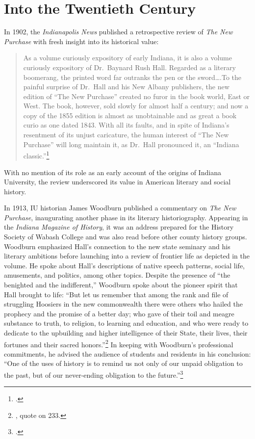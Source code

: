 \documentclass[
  american,
  letterpaper,
]{scrreprt}
\begin{document}
\section{Into the Twentieth Century}\label{into-the-twentieth-century}

In 1902, the \emph{Indianapolis News} published a retrospective review
of \emph{The New Purchase} with fresh insight into its historical value:

\begin{quote}
As a volume curiously expository of early Indiana, it is also a volume
curiously expository of Dr.~Baynard Rush Hall. Regarded as a literary
boomerang, the printed word far outranks the pen or the sword\ldots.To
the painful surprise of Dr.~Hall and his New Albany publishers, the new
edition of ``The New Purchase'' created no furor in the book world, East
or West. The book, however, sold slowly for almost half a century; and
now a copy of the 1855 edition is almost as unobtainable and as great a
book curio as one dated 1843. With all its faults, and in spite of
Indiana's resentment of its unjust caricature, the human interest of
``The New Purchase'' will long maintain it, as Dr.~Hall pronounced it,
an ``Indiana classic.''\footnote{.}
\end{quote}

With no mention of its role as an early account of the origins of
Indiana University, the review underscored its value in American
literary and social history.

In 1913, IU historian James Woodburn published a commentary on \emph{The
New Purchase}, inaugurating another phase in its literary
historiography. Appearing in the \emph{Indiana Magazine of History}, it
was an address prepared for the History Society of Wabash College and
was also read before other county history groups. Woodburn emphasized
Hall's connection to the new state seminary and his literary ambitions
before launching into a review of frontier life as depicted in the
volume. He spoke about Hall's descriptions of native speech patterns,
social life, amusements, and politics, among other topics. Despite the
presence of ``the benighted and the indifferent,'' Woodburn spoke about
the pioneer spirit that Hall brought to life: ``But let us remember that
among the rank and file of struggling Hoosiers in the new commonwealth
there were others who hailed the prophecy and the promise of a better
day; who gave of their toil and meagre substance to truth, to religion,
to learning and education, and who were ready to dedicate to the
upbuilding and higher intelligence of their State, their lives, their
fortunes and their sacred honors.''\footnote{, quote on
  233.} In keeping with Woodburn's professional commitments, he advised
the audience of students and residents in his conclusion: ``One of the
uses of history is to remind us not only of our unpaid obligation to the
past, but of our never-ending obligation to the future.''\footnote{.}
\end{document}
